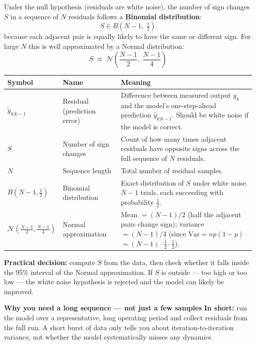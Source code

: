 \documentclass[12pt, a4paper]{article}
\begin{document}
Under the null hypothesis (residuals are white noise), the number of sign
changes $S$ in a sequence of $N$ residuals follows a
\textbf{Binomial distribution}:
\[
  S \in B\!\left(N-1,\;\tfrac{1}{2}\right)
\]
because each adjacent pair is equally likely to have the same or different
sign.
For large $N$ this is well approximated by a Normal distribution:
\[
  S \;\approx\; \mathcal{N}\!\left(\frac{N-1}{2},\;\frac{N-1}{4}\right)
\]

\begin{center}
\begin{tabular}{@{} l p{3.0cm} p{7.5cm} @{}}
  \toprule
  Symbol & Name & Meaning \\
  \midrule
  $\tilde{y}_{k|k-1}$ & Residual (prediction error) &
    Difference between measured output $y_k$ and the model's one-step-ahead
    prediction $\hat{y}_{k|k-1}$.
    Should be white noise if the model is correct. \\
  $S$ & Number of sign changes &
    Count of how many times adjacent residuals have opposite signs across
    the full sequence of $N$ residuals. \\
  $N$ & Sequence length & Total number of residual samples. \\
  $B(N{-}1,\tfrac{1}{2})$ & Binomial distribution &
    Exact distribution of $S$ under white noise.
    $N{-}1$ trials, each succeeding with probability $\tfrac{1}{2}$. \\
  $\mathcal{N}\!\left(\frac{N-1}{2},\frac{N-1}{4}\right)$ &
    Normal approximation &
    Mean $= (N{-}1)/2$ (half the adjacent pairs change sign);
    variance $= (N{-}1)/4$ (since $\text{Var} = np(1-p)$
    $= (N{-}1)\cdot\tfrac{1}{2}\cdot\tfrac{1}{2}$). \\
  \bottomrule
\end{tabular}
\end{center}

\textbf{Practical decision:} compute $S$ from the data, then check whether
it falls inside the 95\% interval of the Normal approximation.
If $S$ is outside --- too high or too low --- the white noise hypothesis
is rejected and the model can likely be improved.

\begin{notebox}
  \textbf{Why you need a long sequence --- not just a few samples}
  \textbf{In short:} run the model over a representative, long operating
  period and collect residuals from the full run.
  A short burst of data only tells you about iteration-to-iteration
  variance, not whether the model systematically misses any dynamics.
\end{notebox}
\end{document}
